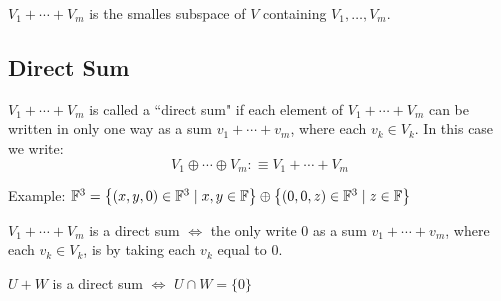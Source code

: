 \setcounter{thm}{39}
\begin{thm}
  $V_1 + \cdots + V_m$ is the smalles subspace of $V$ containing $V_1, \dots, V_m.$
\end{thm}

\subsection{Direct Sum}

\setcounter{thm}{40}
\begin{mydef}
  \label{def-of-direct-sum}
  $V_1 + \cdots + V_m$ is called a ``direct sum" if each element of $V_1 +\cdots+V_m$ can be written in only one way as a sum $v_1 + \cdots + v_m$, where each $v_k \in V_k$. In this case we write:
  \begin{equation}
    V_1 \oplus \cdots \oplus V_m :\equiv V_1 + \cdots + V_m
  \end{equation}
\end{mydef}

\begin{example}
  Example: $\mathbb{F}^3 =
  \left \{ \left ( x, y, 0 \right ) \in \mathbb{F}^3 \mid x,y \in \mathbb{F} \right \}
  \oplus
  \left \{ \left (  0, 0, z  \right ) \in \mathbb{F}^3 \mid z \in \mathbb{F} \right \}$
\end{example}


\setcounter{thm}{44}
\begin{thm}
  \label{condition-for-a-direct-sum}
  $V_1 + \cdots + V_m$ is a direct sum $\iff$ the only write $0$ as a sum $v_1 + \cdots + v_m$, where each $v_k \in V_k$, is by taking each $v_k$ equal to $0$.
\end{thm}


\setcounter{thm}{45}
\begin{thm}
  \label{direct-sum-of-two-subscpaces}
  $U+W$ is a direct sum $\iff$ $U \cap W = \{0\}$
\end{thm}
